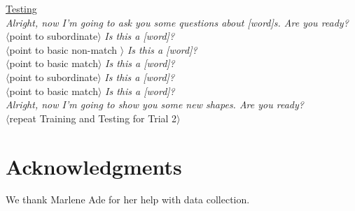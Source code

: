 \documentclass[man]{apa2}
\begin{document}
\noindent \underline{Testing} \\
{\it Alright, now I'm going to ask you some questions about [word]s. Are you ready?} \\
$\langle$point to subordinate$\rangle$ {\it Is this a [word]?} \\
$\langle$point to basic non-match $\rangle$ {\it Is this a [word]?} \\
$\langle$point to basic match$\rangle$ {\it Is this a [word]?}\\
$\langle$point to subordinate$\rangle$ {\it Is this a [word]?} \\
$\langle$point to basic match$\rangle$ {\it Is this a [word]?} \\
 
{\it Alright, now I'm going to show you some new shapes. Are you ready?}\\

\vspace{2.5mm}
\noindent $\langle$repeat Training and Testing for Trial 2$\rangle$ \\

\nocite{re2013}
\nocite{sanchez2003effect}

\section{Acknowledgments}

We thank Marlene Ade for her help with data collection.





\newpage
\theappendix 
\end{document}
